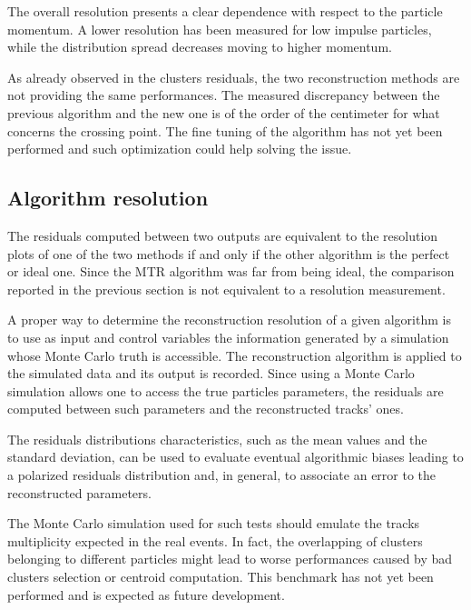 The overall resolution presents a clear dependence with respect to the particle momentum.
A lower resolution has been measured for low impulse particles, while the distribution spread decreases moving to higher momentum.

As already observed in the clusters residuals, the two reconstruction methods are not providing the same performances.
The measured discrepancy between the previous algorithm and the new one is of the order of the centimeter for what concerns the crossing point.
The fine tuning of the algorithm has not yet been performed and such optimization could help solving the issue.

\subsection{Algorithm resolution}
The residuals computed between two outputs are equivalent to the resolution plots of one of the two methods if and only if the other algorithm is the perfect or ideal one.
Since the MTR algorithm was far from being ideal, the comparison reported in the previous section is not equivalent to a resolution measurement.

A proper way to determine the reconstruction resolution of a given algorithm is to use as input and control variables the information generated by a simulation whose Monte Carlo truth is accessible.
The reconstruction algorithm is applied to the simulated data and its output is recorded.
Since using a Monte Carlo simulation allows one to access the true particles parameters, the residuals are computed between such parameters and the reconstructed tracks' ones.

The residuals distributions characteristics, such as the mean values and the standard deviation, can be used to evaluate eventual algorithmic biases leading to a polarized residuals distribution and, in general, to associate an error to the reconstructed parameters.

The Monte Carlo simulation used for such tests should emulate the tracks multiplicity expected in the real events.
In fact, the overlapping of clusters belonging to different particles might lead to worse performances caused by bad clusters selection or centroid computation.
This benchmark has not yet been performed and is expected as future development.

